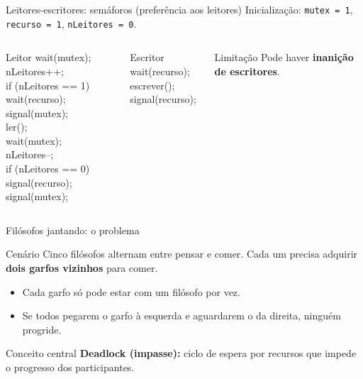 \documentclass[aspectratio=169,11pt]{beamer}
\begin{document}
\begin{frame}[fragile]{Leitores-escritores: semáforos (preferência aos leitores)}
\small
Inicialização: \texttt{mutex = 1}, \texttt{recurso = 1}, \texttt{nLeitores = 0}.
\vspace{0.2cm}
\begin{columns}[T,onlytextwidth]
\begin{block}{Leitor}
\ttfamily\scriptsize
wait(mutex);\\
nLeitores++;\\
if (nLeitores == 1) wait(recurso);\\
signal(mutex);\\
ler();\\
wait(mutex);\\
nLeitores--;\\
if (nLeitores == 0) signal(recurso);\\
signal(mutex);
\end{block}
\begin{block}{Escritor}
\ttfamily\scriptsize
wait(recurso);\\
escrever();\\
signal(recurso);
\end{block}
\begin{alertblock}{Limitação}
Pode haver \textbf{inanição de escritores}.
\end{alertblock}
\end{columns}
\end{frame}



\begin{frame}{Filósofos jantando: o problema}
\begin{block}{Cenário}
Cinco filósofos alternam entre pensar e comer. Cada um precisa adquirir \textbf{dois garfos vizinhos} para comer.
\end{block}
\begin{itemize}
\item Cada garfo só pode estar com um filósofo por vez.
\item Se todos pegarem o garfo à esquerda e aguardarem o da direita, ninguém progride.
\end{itemize}
\vspace{0.15cm}
\begin{alertblock}{Conceito central}
\textbf{Deadlock (impasse):} ciclo de espera por recursos que impede o progresso dos participantes.
\end{alertblock}
\end{frame}
\end{document}
